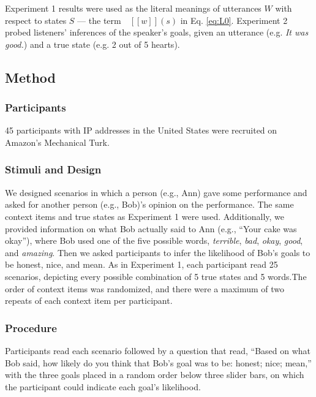 \documentclass[10pt,letterpaper]{article}
\newcommand{\denote}[1]{\mbox{ $[\![ #1 ]\!]$}}
\begin{document}
Experiment 1 results were used as the literal meanings of utterances $W$ with respect to states $S$ --- the term $\denote{w}(s)$ in Eq. \ref{eq:L0}.
Experiment 2 probed listeners' inferences of the speaker's goals, given an utterance (e.g. \emph{It was good.}) and a true state (e.g. 2 out of 5 hearts). 

\subsection{Method} 

\subsubsection{Participants}

45 participants with IP addresses in the United States were recruited on Amazon's Mechanical Turk. 

\subsubsection{Stimuli and Design}

We designed scenarios in which a person (e.g., Ann) gave some performance and asked for another person (e.g., Bob)'s opinion on the performance. The same context items and true states as Experiment 1 were used. Additionally, we provided information on what Bob actually said to Ann (e.g., ``Your cake was okay''), where Bob used one of the five possible words,  \emph{terrible}, \emph{bad}, \emph{okay}, \emph{good}, and \emph{amazing}. Then we asked participants to infer the likelihood of Bob's goals to be honest, nice, and mean. As in Experiment 1, each participant read 25 scenarios, depicting every possible combination of 5 true states and 5 words.The order of context items was randomized, and there were a maximum of two repeats of each context item per participant.

\subsubsection{Procedure}
Participants read each scenario followed by a question that read, ``Based on what Bob said, how likely do you think that Bob's goal was to be: honest; nice; mean,'' with the three goals placed in a random order below three slider bars, on which the participant could indicate each goal's likelihood.
\end{document}
